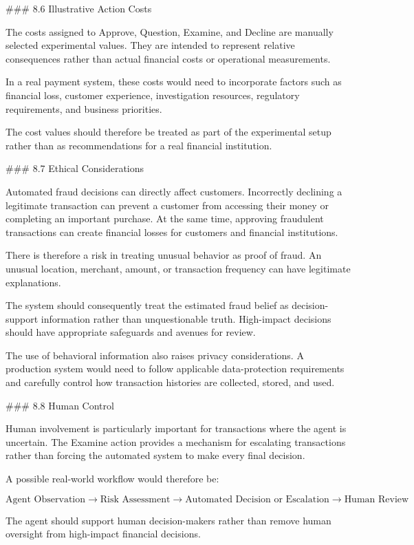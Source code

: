 ### 8.6 Illustrative Action Costs

The costs assigned to Approve, Question, Examine, and Decline are manually selected experimental values. They are intended to represent relative consequences rather than actual financial costs or operational measurements.

In a real payment system, these costs would need to incorporate factors such as financial loss, customer experience, investigation resources, regulatory requirements, and business priorities.

The cost values should therefore be treated as part of the experimental setup rather than as recommendations for a real financial institution.

### 8.7 Ethical Considerations

Automated fraud decisions can directly affect customers. Incorrectly declining a legitimate transaction can prevent a customer from accessing their money or completing an important purchase. At the same time, approving fraudulent transactions can create financial losses for customers and financial institutions.

There is therefore a risk in treating unusual behavior as proof of fraud. An unusual location, merchant, amount, or transaction frequency can have legitimate explanations.

The system should consequently treat the estimated fraud belief as decision-support information rather than unquestionable truth. High-impact decisions should have appropriate safeguards and avenues for review.

The use of behavioral information also raises privacy considerations. A production system would need to follow applicable data-protection requirements and carefully control how transaction histories are collected, stored, and used.

### 8.8 Human Control

Human involvement is particularly important for transactions where the agent is uncertain. The Examine action provides a mechanism for escalating transactions rather than forcing the automated system to make every final decision.

A possible real-world workflow would therefore be:

$$
\text{Agent Observation}
\rightarrow
\text{Risk Assessment}
\rightarrow
\text{Automated Decision or Escalation}
\rightarrow
\text{Human Review}
$$

The agent should support human decision-makers rather than remove human oversight from high-impact financial decisions.

